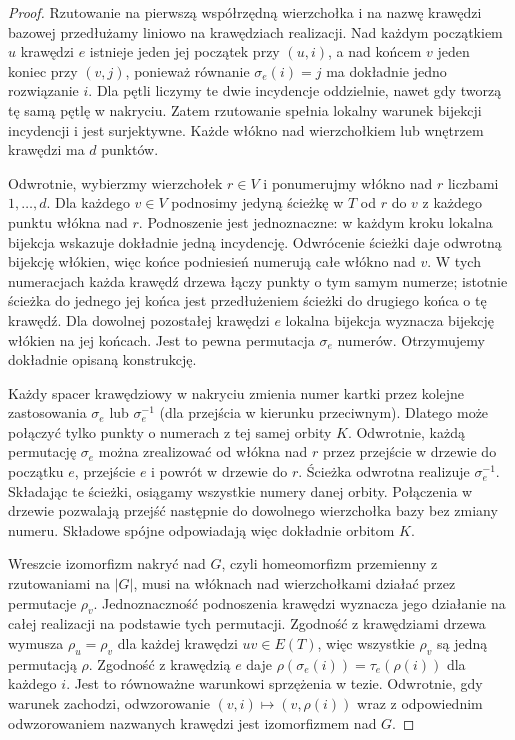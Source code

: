 \begin{proof}
Rzutowanie na pierwszą współrzędną wierzchołka
i na nazwę krawędzi bazowej przedłużamy liniowo
na krawędziach realizacji. Nad każdym początkiem
$u$ krawędzi $e$ istnieje jeden jej początek
przy $(u,i)$, a nad końcem $v$ jeden koniec
przy $(v,j)$, ponieważ równanie $\sigma_e(i)=j$
ma dokładnie jedno rozwiązanie $i$.
Dla pętli liczymy te dwie incydencje oddzielnie,
nawet gdy tworzą tę samą pętlę w nakryciu.
Zatem rzutowanie spełnia lokalny warunek bijekcji
incydencji i jest surjektywne. Każde włókno nad
wierzchołkiem lub wnętrzem krawędzi ma $d$ punktów.

Odwrotnie, wybierzmy wierzchołek $r\in V$ i
ponumerujmy włókno nad $r$ liczbami $1,\ldots,d$.
Dla każdego $v\in V$ podnosimy jedyną ścieżkę w $T$
od $r$ do $v$ z każdego punktu włókna nad $r$.
Podnoszenie jest jednoznaczne: w każdym kroku
lokalna bijekcja wskazuje dokładnie jedną incydencję.
Odwrócenie ścieżki daje odwrotną bijekcję włókien,
więc końce podniesień numerują całe włókno nad $v$.
W tych numeracjach każda krawędź drzewa łączy
punkty o tym samym numerze; istotnie ścieżka do
jednego jej końca jest przedłużeniem ścieżki do
drugiego końca o tę krawędź.
Dla dowolnej pozostałej krawędzi $e$ lokalna
bijekcja wyznacza bijekcję włókien na jej końcach.
Jest to pewna permutacja $\sigma_e$ numerów.
Otrzymujemy dokładnie opisaną konstrukcję.

Każdy spacer krawędziowy w nakryciu zmienia numer kartki
przez kolejne zastosowania $\sigma_e$ lub
$\sigma_e^{-1}$ (dla przejścia w kierunku przeciwnym).
Dlatego może połączyć tylko punkty o numerach
z tej samej orbity $K$. Odwrotnie, każdą permutację
$\sigma_e$ można zrealizować od włókna nad $r$
przez przejście w drzewie do początku $e$, przejście
$e$ i powrót w drzewie do $r$. Ścieżka odwrotna
realizuje $\sigma_e^{-1}$. Składając te ścieżki,
osiągamy wszystkie numery danej orbity.
Połączenia w drzewie pozwalają przejść następnie
do dowolnego wierzchołka bazy bez zmiany numeru.
Składowe spójne odpowiadają więc dokładnie orbitom $K$.

Wreszcie izomorfizm nakryć nad $G$, czyli homeomorfizm
przemienny z rzutowaniami na $|G|$, musi na włóknach
nad wierzchołkami działać przez permutacje $\rho_v$.
Jednoznaczność podnoszenia krawędzi wyznacza jego
działanie na całej realizacji na podstawie tych permutacji.
Zgodność z krawędziami drzewa wymusza
$\rho_u=\rho_v$ dla każdej krawędzi $uv\in E(T)$,
więc wszystkie $\rho_v$ są jedną permutacją $\rho$.
Zgodność z krawędzią $e$ daje
$\rho(\sigma_e(i))=\tau_e(\rho(i))$ dla każdego $i$.
Jest to równoważne warunkowi sprzężenia w tezie.
Odwrotnie, gdy warunek zachodzi, odwzorowanie
$(v,i)\mapsto(v,\rho(i))$ wraz z odpowiednim
odwzorowaniem nazwanych krawędzi jest izomorfizmem
nad $G$.
\end{proof}

